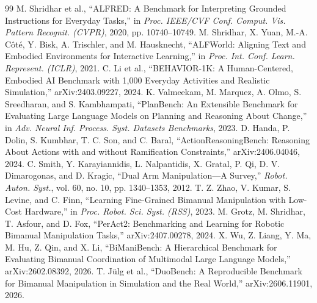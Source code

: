\begin{thebibliography}{99}
 M. Shridhar et al., ``ALFRED: A Benchmark for Interpreting Grounded Instructions for Everyday Tasks,'' in \emph{Proc. IEEE/CVF Conf. Comput. Vis. Pattern Recognit. (CVPR)}, 2020, pp. 10740--10749.
 M. Shridhar, X. Yuan, M.-A. C\^ot\'e, Y. Bisk, A. Trischler, and M. Hausknecht, ``ALFWorld: Aligning Text and Embodied Environments for Interactive Learning,'' in \emph{Proc. Int. Conf. Learn. Represent. (ICLR)}, 2021.
 C. Li et al., ``BEHAVIOR-1K: A Human-Centered, Embodied AI Benchmark with 1,000 Everyday Activities and Realistic Simulation,'' arXiv:2403.09227, 2024.
 K. Valmeekam, M. Marquez, A. Olmo, S. Sreedharan, and S. Kambhampati, ``PlanBench: An Extensible Benchmark for Evaluating Large Language Models on Planning and Reasoning About Change,'' in \emph{Adv. Neural Inf. Process. Syst. Datasets Benchmarks}, 2023.
 D. Handa, P. Dolin, S. Kumbhar, T. C. Son, and C. Baral, ``ActionReasoningBench: Reasoning About Actions with and without Ramification Constraints,'' arXiv:2406.04046, 2024.
 C. Smith, Y. Karayiannidis, L. Nalpantidis, X. Gratal, P. Qi, D. V. Dimarogonas, and D. Kragic, ``Dual Arm Manipulation---A Survey,'' \emph{Robot. Auton. Syst.}, vol. 60, no. 10, pp. 1340--1353, 2012.
 T. Z. Zhao, V. Kumar, S. Levine, and C. Finn, ``Learning Fine-Grained Bimanual Manipulation with Low-Cost Hardware,'' in \emph{Proc. Robot. Sci. Syst. (RSS)}, 2023.
 M. Grotz, M. Shridhar, T. Asfour, and D. Fox, ``PerAct2: Benchmarking and Learning for Robotic Bimanual Manipulation Tasks,'' arXiv:2407.00278, 2024.
 X. Wu, Z. Liang, Y. Ma, M. Hu, Z. Qin, and X. Li, ``BiManiBench: A Hierarchical Benchmark for Evaluating Bimanual Coordination of Multimodal Large Language Models,'' arXiv:2602.08392, 2026.
 T. J\"ulg et al., ``DuoBench: A Reproducible Benchmark for Bimanual Manipulation in Simulation and the Real World,'' arXiv:2606.11901, 2026.


\end{thebibliography}
